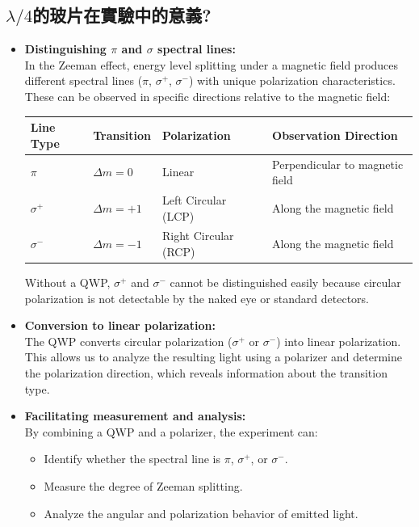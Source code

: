 \documentclass[a4paper,12pt]{article}
\begin{document}
    
    \subsection{$\lambda/4$的玻片在實驗中的意義?}
    \par 
    \begin{itemize}
        \item \textbf{Distinguishing $\pi$ and $\sigma$ spectral lines:} \\
        In the Zeeman effect, energy level splitting under a magnetic field produces different spectral lines ($\pi$, $\sigma^+$, $\sigma^-$) with unique polarization characteristics. These can be observed in specific directions relative to the magnetic field:
    
        \begin{center}
        \begin{tabular}{@{}llll@{}}
        \toprule
        \textbf{Line Type} & \textbf{Transition} & \textbf{Polarization} & \textbf{Observation Direction} \\
        \midrule
        $\pi$ & $\Delta m = 0$ & Linear & Perpendicular to magnetic field \\
        $\sigma^+$ & $\Delta m = +1$ & Left Circular (LCP) & Along the magnetic field \\
        $\sigma^-$ & $\Delta m = -1$ & Right Circular (RCP) & Along the magnetic field \\
        \bottomrule
        \end{tabular}
        \end{center}
    
        Without a QWP, $\sigma^+$ and $\sigma^-$ cannot be distinguished easily because circular polarization is not detectable by the naked eye or standard detectors.
    
        \item \textbf{Conversion to linear polarization:} \\
        The QWP converts circular polarization ($\sigma^+$ or $\sigma^-$) into linear polarization. This allows us to analyze the resulting light using a polarizer and determine the polarization direction, which reveals information about the transition type.
    
        \item \textbf{Facilitating measurement and analysis:} \\
        By combining a QWP and a polarizer, the experiment can:
        \begin{itemize}
            \item Identify whether the spectral line is $\pi$, $\sigma^+$, or $\sigma^-$.
            \item Measure the degree of Zeeman splitting.
            \item Analyze the angular and polarization behavior of emitted light.
        \end{itemize}
    \end{itemize}
    
\end{document}
